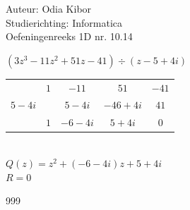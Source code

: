 \documentclass[a4paper]{article}
\begin{document}
  
\noindent \large Auteur: Odia Kibor \\
\noindent \large Studierichting: Informatica\\
\noindent \large Oefeningenreeks 1D nr. 10.14\\

\medskip

\normalsize

$(3z^3 - 11z^2 + 51z - 41)\div(z - 5 + 4i)$ \\


\begin{tabular}{c|cccc}
		& $1$ & $-11$ & $51$ & $-41$ \\
$5 - 4i$ 	&     & $5 - 4i$  & $-46 + 4i$ & $41$  \\ \hline
		& $1$ & $-6 - 4i$ & $5 + 4i$  & $0$ \\
\end{tabular}\\

$Q(z) = z^2 + (-6 - 4i)z + 5 + 4i$ \\

$R = 0$ \\








\begin{thebibliography}{999}
\end{thebibliography}
\end{document}
